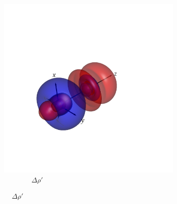\documentclass[journal=inoraj,manuscript=article]{achemso}
\begin{document}
\begin{figure}[!h]
    \centering
    \centering
    \begin{subfigure}[t]{0.33\textwidth}
        \centering
        \includegraphics[width=\linewidth]{./AuRn+/diff_tot.png} 
        \caption*{\ \ \ \ \ \ \ \ $\Delta \rho'$} 
    \end{subfigure}
    \hfill
 

\end{figure}
\end{document}
